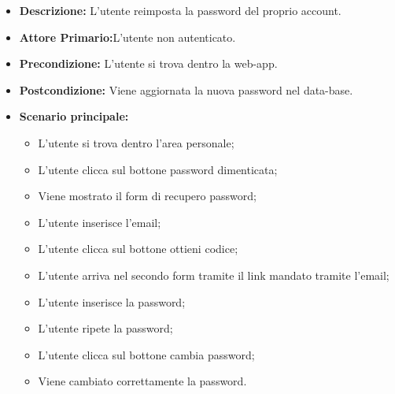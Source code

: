 \begin{itemize}
    \item \textbf{Descrizione:} L'utente reimposta la password del proprio account.
    \item \textbf{Attore Primario:}L'utente non autenticato.
    \item \textbf{Precondizione:} L'utente si trova dentro la web-app.
    \item \textbf{Postcondizione:} Viene aggiornata la nuova password nel data-base.
    \item \textbf{Scenario principale:}
    \begin{itemize}
        \item L'utente si trova dentro l'area personale;
        \item L'utente clicca sul bottone password dimenticata;
        \item Viene mostrato il form di recupero password;
        \item L'utente inserisce l'email;
        \item L'utente clicca sul bottone ottieni codice;
        \item L'utente arriva nel secondo form tramite il link mandato tramite l'email;
        \item L'utente inserisce la password;
        \item L'utente ripete la password;
        \item L'utente clicca sul bottone cambia password;
        \item Viene cambiato correttamente la password.
    \end{itemize}
\end{itemize}
